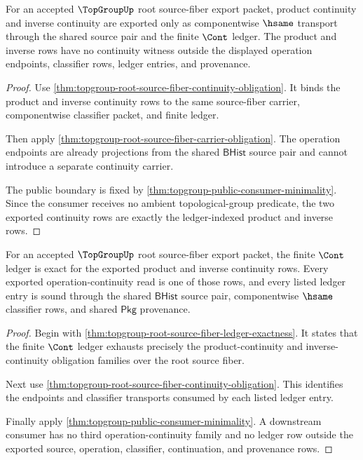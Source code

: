 \begin{theorem}
\label{thm:topgroup-root-source-fiber-export-continuity}
For an accepted $\TopGroupUp$ root source-fiber export packet, product
continuity and inverse continuity are exported only as componentwise $\hsame$
transport through the shared source pair and the finite $\Cont$ ledger. The
product and inverse rows have no continuity witness outside the displayed
operation endpoints, classifier rows, ledger entries, and provenance.
\end{theorem}
\begin{proof}
Use \autoref{thm:topgroup-root-source-fiber-continuity-obligation}. It binds
the product and inverse continuity rows to the same source-fiber carrier,
componentwise classifier packet, and finite ledger.

Then apply
\autoref{thm:topgroup-root-source-fiber-carrier-obligation}. The operation
endpoints are already projections from the shared $\mathsf{BHist}$ source pair
and cannot introduce a separate continuity carrier.

The public boundary is fixed by
\autoref{thm:topgroup-public-consumer-minimality}. Since the consumer receives
no ambient topological-group predicate, the two exported continuity rows are
exactly the ledger-indexed product and inverse rows.
\end{proof}

\begin{theorem}
\label{thm:topgroup-root-source-fiber-export-ledger}
For an accepted $\TopGroupUp$ root source-fiber export packet, the finite
$\Cont$ ledger is exact for the exported product and inverse continuity rows.
Every exported operation-continuity read is one of those rows, and every listed
ledger entry is sound through the shared $\mathsf{BHist}$ source pair,
componentwise $\hsame$ classifier rows, and shared $\mathsf{Pkg}$ provenance.
\end{theorem}
\begin{proof}
Begin with
\autoref{thm:topgroup-root-source-fiber-ledger-exactness}. It states that the
finite $\Cont$ ledger exhausts precisely the product-continuity and
inverse-continuity obligation families over the root source fiber.

Next use
\autoref{thm:topgroup-root-source-fiber-continuity-obligation}. This identifies
the endpoints and classifier transports consumed by each listed ledger entry.

Finally apply
\autoref{thm:topgroup-public-consumer-minimality}. A downstream consumer has no
third operation-continuity family and no ledger row outside the exported
source, operation, classifier, continuation, and provenance rows.
\end{proof}

